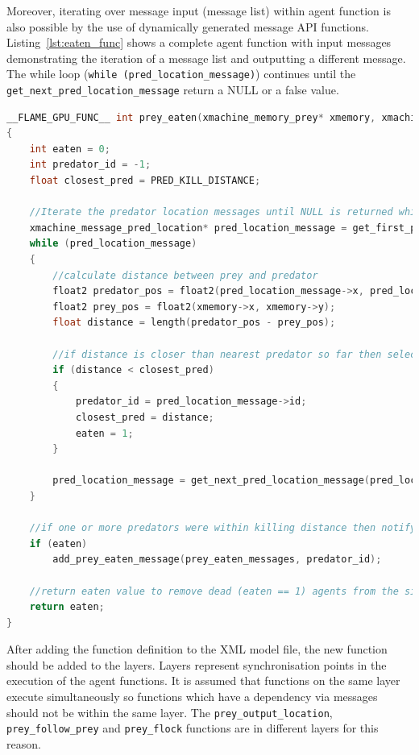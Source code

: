 Moreover, iterating over message input (message list) within agent function is also possible by the use of dynamically generated message API functions. Listing~\ref{lst:eaten_func} shows a complete agent function with input messages demonstrating the iteration of a message list and outputting a different message. The while loop (\verb|while (pred_location_message)|) continues until the \verb|get_next_pred_location_message| return a NULL or a false value. 


\begin{lstlisting}[linewidth=\columnwidth,breaklines=true,language=C++,caption={},label=lst:eaten_func]
__FLAME_GPU_FUNC__ int prey_eaten(xmachine_memory_prey* xmemory, xmachine_message_pred_location_list* pred_location_messages, xmachine_message_prey_eaten_list* prey_eaten_messages)
{
	int eaten = 0;
	int predator_id = -1;
	float closest_pred = PRED_KILL_DISTANCE;

	//Iterate the predator location messages until NULL is returned which indicates all messages have been read.
	xmachine_message_pred_location* pred_location_message = get_first_pred_location_message(pred_location_messages);
    while (pred_location_message)
	{
		//calculate distance between prey and predator
		float2 predator_pos = float2(pred_location_message->x, pred_location_message->y);
		float2 prey_pos = float2(xmemory->x, xmemory->y);
		float distance = length(predator_pos - prey_pos);

		//if distance is closer than nearest predator so far then select this predator as the one which will eat the prey
		if (distance < closest_pred)
		{
			predator_id = pred_location_message->id;
			closest_pred = distance;
			eaten = 1;
		}

		pred_location_message = get_next_pred_location_message(pred_location_message, pred_location_messages);
	}

	//if one or more predators were within killing distance then notify the nearest predator that it has eaten this prey via a prey eaten message.
	if (eaten)
		add_prey_eaten_message(prey_eaten_messages, predator_id);

	//return eaten value to remove dead (eaten == 1) agents from the simulation
	return eaten;
}
\end{lstlisting}


After adding the function definition to the XML model file, the new function should be added to the layers. Layers represent synchronisation points in the execution of the agent functions. It is assumed that functions on the same layer execute simultaneously so functions which have a dependency via messages should not be within the same layer. The \verb|prey_output_location|, \verb|prey_follow_prey| and \verb|prey_flock| functions are in different layers for this reason. 

